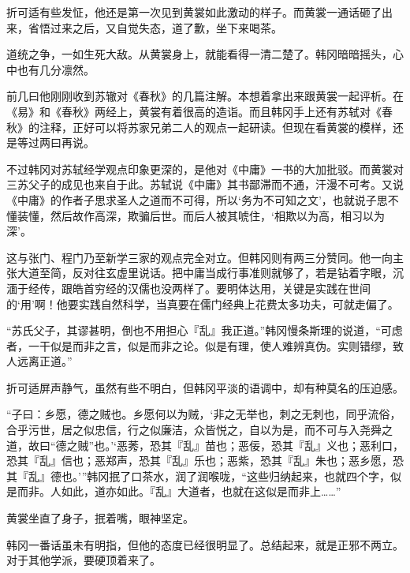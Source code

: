 折可适有些发怔，他还是第一次见到黄裳如此激动的样子。而黄裳一通话砸了出来，省悟过来之后，又自觉失态，道了歉，坐下来喝茶。

道统之争，一如生死大敌。从黄裳身上，就能看得一清二楚了。韩冈暗暗摇头，心中也有几分凛然。

前几曰他刚刚收到苏辙对《春秋》的几篇注解。本想着拿出来跟黄裳一起评析。在《易》和《春秋》两经上，黄裳有着很高的造诣。而且韩冈手上还有苏轼对《春秋》的注释，正好可以将苏家兄弟二人的观点一起研读。但现在看黄裳的模样，还是等过两曰再说。

不过韩冈对苏轼经学观点印象更深的，是他对《中庸》一书的大加批驳。而黄裳对三苏父子的成见也来自于此。苏轼说《中庸》其书鄙滞而不通，汗漫不可考。又说《中庸》的作者子思求圣人之道而不可得，所以‘务为不可知之文’，也就说子思不懂装懂，然后故作高深，欺骗后世。而后人被其唬住，‘相欺以为高，相习以为深’。

这与张门、程门乃至新学三家的观点完全对立。但韩冈则有两三分赞同。他一向主张大道至简，反对往玄虚里说话。把中庸当成行事准则就够了，若是钻着字眼，沉湎于经传，跟皓首穷经的汉儒也没两样了。要明体达用，关键是实践在世间的‘用’啊！他要实践自然科学，当真要在儒门经典上花费太多功夫，可就走偏了。

“苏氏父子，其谬甚明，倒也不用担心『乱』我正道。”韩冈慢条斯理的说道，“可虑者，一干似是而非之言，似是而非之论。似是有理，使人难辨真伪。实则错缪，致人远离正道。”

折可适屏声静气，虽然有些不明白，但韩冈平淡的语调中，却有种莫名的压迫感。

“子曰：乡愿，德之贼也。乡愿何以为贼，‘非之无举也，刺之无刺也，同乎流俗，合乎污世，居之似忠信，行之似廉洁，众皆悦之，自以为是，而不可与入尧舜之道，故曰“德之贼”也。’‘恶莠，恐其『乱』苗也；恶佞，恐其『乱』义也；恶利口，恐其『乱』信也；恶郑声，恐其『乱』乐也；恶紫，恐其『乱』朱也；恶乡愿，恐其『乱』德也。’”韩冈抿了口茶水，润了润喉咙，“这些归纳起来，也就四个字，似是而非。人如此，道亦如此。『乱』大道者，也就在这似是而非上……”

黄裳坐直了身子，抿着嘴，眼神坚定。

韩冈一番话虽未有明指，但他的态度已经很明显了。总结起来，就是正邪不两立。对于其他学派，要硬顶着来了。


